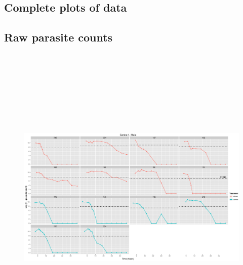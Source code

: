 \begin{singlespace}
\chapter{Complete plots of data}
\section{Raw parasite counts}
\begin{figure}
\includegraphics[height=150mm]{Araw1M.eps}
\end{figure}
\begin{figure}

\end{figure}
\end{singlespace}
